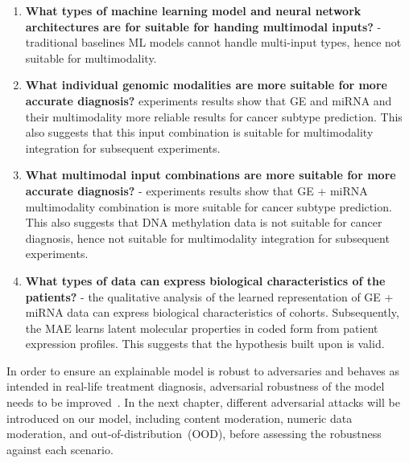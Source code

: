 \begin{enumerate}[noitemsep]
    \item \textbf{What types of machine learning model and neural network architectures are for suitable for handing multimodal inputs?} - traditional baselines ML models cannot handle multi-input types, hence not suitable for multimodality. 
    \item \textbf{What individual genomic modalities are more suitable for more accurate diagnosis?} experiments results show that GE and miRNA and their multimodality more reliable results for cancer subtype prediction. This also suggests that this input combination is suitable for multimodality integration for subsequent experiments. 
    \item \textbf{What multimodal input combinations are more suitable for more accurate diagnosis?} - experiments results show that GE + miRNA multimodality combination is more suitable for cancer subtype prediction. This also suggests that DNA methylation data is not suitable for cancer diagnosis, hence not suitable for multimodality integration for subsequent experiments.
    \item \textbf{What types of data can express biological characteristics of the patients?} - the qualitative analysis of the learned representation of GE + miRNA data can express biological characteristics of cohorts. Subsequently, the MAE learns latent molecular properties in coded form from patient expression profiles. This suggests that the hypothesis built upon is valid. 
\end{enumerate}

\hspace*{3.5mm} In order to ensure an explainable model is robust to adversaries and behaves as intended in real-life treatment diagnosis, adversarial robustness of the model needs to be improved~\cite{bhatt2020explainable}. In the next chapter, different adversarial attacks will be introduced on our model, including content moderation, numeric data moderation, and out-of-distribution~(OOD), before assessing the robustness against each scenario. 
